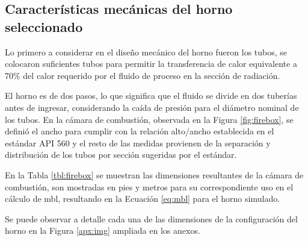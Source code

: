 \subsection{Características mecánicas del horno seleccionado}
\par Lo primero a considerar en el diseño mecánico del horno fueron los tubos, se colocaron suficientes tubos para permitir la transferencia de calor equivalente a 70\% del calor requerido por el fluido de proceso en la sección de radiación.
\par El horno es de dos pasos, lo que significa que el fluido se divide en dos tuberías antes de ingresar, considerando la caída de presión para el diámetro nominal de los tubos. En la cámara de combustión, observada en la Figura \ref{fig:firebox}, se definió el ancho para cumplir con la relación alto/ancho establecida en el estándar API 560 \cite{bib:api560} y el resto de las medidas provienen de la separación y distribución de los tubos por sección sugeridas por el estándar.
\par En la Tabla \ref{tbl:firebox} se muestran las dimensiones resultantes de la cámara de combustión, son mostradas en pies y metros para su correspondiente uso en el cálculo de \ac{mbl}, resultando en la Ecuación \ref{eq:mbl} para el horno simulado.
\par Se puede observar a detalle cada una de las dimensiones de la configuración del horno en la Figura \ref{apx:img} ampliada en los anexos.
